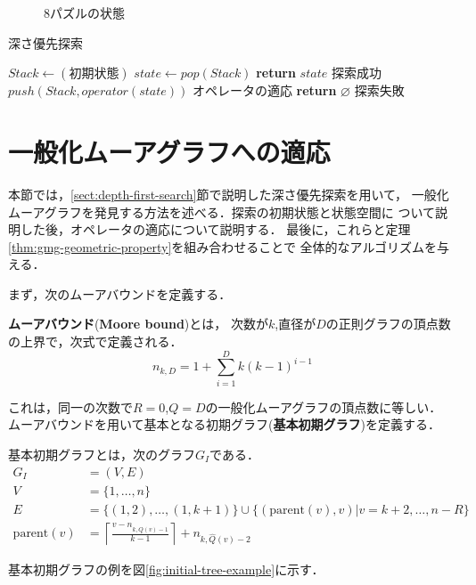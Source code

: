 \begin{figure}
  \centering
  \hspace{3em}
  \caption{8パズルの状態}
\end{figure}

\begin{algorithm}[H]
  \caption{深さ優先探索}
  \label{algo:depth-first-search}
  \begin{algorithmic}[1]
    \State $Stack\gets(初期状態)$
    \State $state\gets pop(Stack)$
    \State \textbf{return} $state$
    \Comment 探索成功
    \EndIf
    \State $push(Stack, operator(state))$
    \Comment オペレータの適応
    \EndFor
    \EndWhile
    \State \textbf{return} $\varnothing$
    \Comment 探索失敗
    \EndProcedure
  \end{algorithmic}
\end{algorithm}

\section{一般化ムーアグラフへの適応}
\label{sect:apply-to-gmg}
本節では，\ref{sect:depth-first-search}節で説明した深さ優先探索を用いて，
一般化ムーアグラフを発見する方法を述べる．探索の初期状態と状態空間に
ついて説明した後，オペレータの適応について説明する．
最後に，これらと定理\ref{thm:gmg-geometric-property}を組み合わせることで
全体的なアルゴリズムを与える．

まず，次のムーアバウンドを定義する．
\begin{definition}
  \textbf{ムーアバウンド}(\textbf{Moore bound})とは，
  次数が$k$,直径が$D$の正則グラフの頂点数の上界で，次式で定義される．
  \begin{equation}
    n_{k,D} = 1 + \sum_{i=1}^Dk(k-1)^{i-1}
  \end{equation}
\end{definition}
これは，同一の次数で$R=0$,$Q=D$の一般化ムーアグラフの頂点数に等しい．
ムーアバウンドを用いて基本となる初期グラフ(\textbf{基本初期グラフ})を定義する．
\begin{definition}[基本初期グラフ]
  \label{def:basic-initial-graph}
  基本初期グラフとは，次のグラフ$G_I$である．
  \begin{equation}
    \begin{aligned}
      \label{eq:basic-initial-graph}
      G_I&=(V,E) \\
      V&=\{1,\ldots,n\} \\
      E&=\{(1,2),\ldots,(1,k+1)\}\cup
      \{(\text{parent}(v),v)|v=k+2,\ldots,n-R\} \\
      \text{parent}(v)&=
      \left\lceil\frac{v-n_{k,\hat{Q}(v)-1}}{k-1}\right\rceil+n_{k,\hat{Q}(v)-2}
    \end{aligned}
  \end{equation}
\end{definition}
基本初期グラフの例を図\ref{fig:initial-tree-example}に示す．

